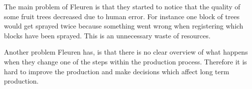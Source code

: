The main problem of Fleuren is that they started to notice that the quality of some fruit trees decreased due to human error. For instance  one block of trees would get sprayed twice because something went wrong when registering which blocks have been sprayed. This is an unnecessary waste of resources.

Another problem Fleuren has, is that there is no clear overview of what happens when they change one of the steps within the production process. Therefore it is hard to improve the production and make decisions which affect long term production.